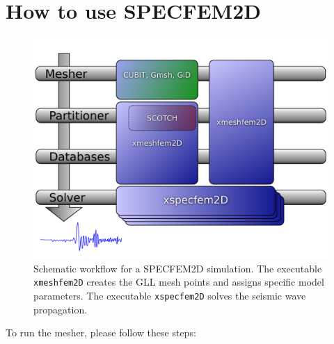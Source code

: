 \documentclass[oneside,english,onecolumn,letterpaper]{book}
\begin{document}

\section{How to use SPECFEM2D}

\begin{figure}[htbp]
\noindent \begin{centering}
\includegraphics[width=.6\textwidth]{figures/workflow}
\par\end{centering}

\caption{Schematic workflow for a SPECFEM2D simulation. The executable \texttt{xmeshfem2D} creates the GLL mesh points and assigns specific model parameters. The executable \texttt{xspecfem2D} solves the seismic wave propagation.}

\label{fig:workflow.databases}
\end{figure}


\noindent
To run the mesher, please follow these steps:
\end{document}
